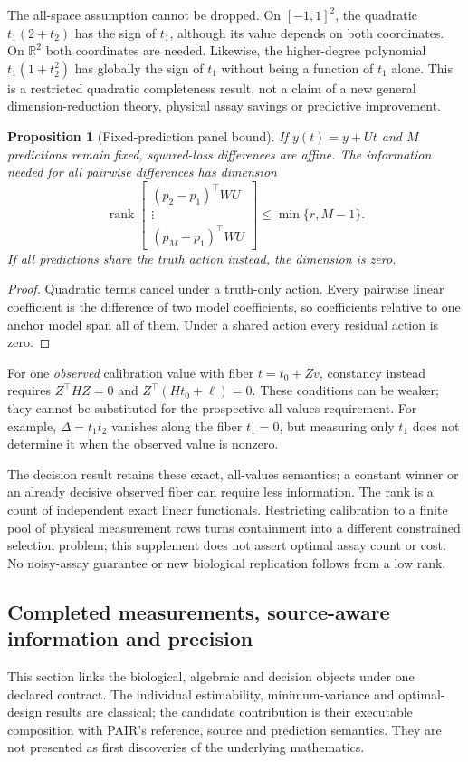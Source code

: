 \documentclass[11pt]{article}
\newtheorem{proposition}{Proposition}
\DeclareMathOperator{\rank}{rank}\DeclareMathOperator{\kerop}{ker}
\begin{document}
The all-space assumption cannot be dropped. On $[-1,1]^2$, the quadratic $t_1(2+t_2)$ has the sign of $t_1$, although its value depends on both coordinates. On $\mathbb R^2$ both coordinates are needed. Likewise, the higher-degree polynomial $t_1(1+t_2^2)$ has globally the sign of $t_1$ without being a function of $t_1$ alone. This is a restricted quadratic completeness result, not a claim of a new general dimension-reduction theory, physical assay savings or predictive improvement.

\begin{proposition}[Fixed-prediction panel bound]
If $y(t)=y+Ut$ and $M$ predictions remain fixed, squared-loss differences are affine. The information needed for all pairwise differences has dimension
\[
\rank\!\begin{bmatrix}(p_2-p_1)^\top WU\\\vdots\\(p_M-p_1)^\top WU\end{bmatrix}\le\min\{r,M-1\}.
\]
If all predictions share the truth action instead, the dimension is zero.
\end{proposition}
\begin{proof}
Quadratic terms cancel under a truth-only action. Every pairwise linear coefficient is the difference of two model coefficients, so coefficients relative to one anchor model span all of them. Under a shared action every residual action is zero.
\end{proof}
For one \emph{observed} calibration value with fiber $t=t_0+Zv$, constancy instead requires $Z^\top HZ=0$ and $Z^\top(Ht_0+\ell)=0$. These conditions can be weaker; they cannot be substituted for the prospective all-values requirement. For example, $\Delta=t_1t_2$ vanishes along the fiber $t_1=0$, but measuring only $t_1$ does not determine it when the observed value is nonzero.

The decision result retains these exact, all-values semantics; a constant winner or an already decisive observed fiber can require less information. The rank is a count of independent exact linear functionals. Restricting calibration to a finite pool of physical measurement rows turns containment into a different constrained selection problem; this supplement does not assert optimal assay count or cost. No noisy-assay guarantee or new biological replication follows from a low rank.


\subsection{Completed measurements, source-aware information and precision}
\label{sec:claiminformation}
This section links the biological, algebraic and decision objects under one declared contract. The individual estimability, minimum-variance and optimal-design results are classical; the candidate contribution is their executable composition with PAIR's reference, source and prediction semantics. They are not presented as first discoveries of the underlying mathematics.
\end{document}
